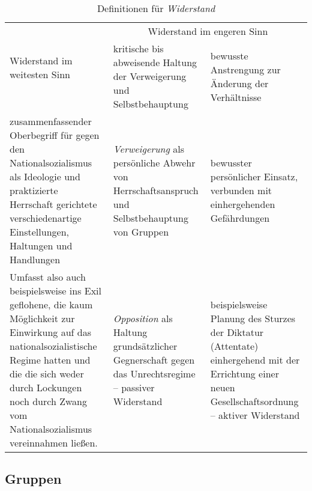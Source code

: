 \begin{table}
\caption{Definitionen für \emph{Widerstand}}
\label{tab:widerst-def}

\newlength{\colwidth}
\setlength{\colwidth}{0.33\textwidth}
\addtolength{\colwidth}{-2\tabcolsep}

\renewcommand*{\arraystretch}{1.5}

\begin{tabular*}{\textwidth}{*{3}{p{\colwidth}}}
\toprule

\multirow{2}{\colwidth}{\centering Widerstand im weitesten Sinn} &
\multicolumn{2}{c}{Widerstand im engeren Sinn} \\

\cmidrule{2-3}

&
kritische bis abweisende Haltung der Verweigerung und Selbstbehauptung
&
bewusste Anstrengung zur Änderung der Verhältnisse \\

\midrule

zusammenfassender Oberbegriff für gegen den Nationalsozialismus als
Ideologie und praktizierte Herrschaft gerichtete verschiedenartige
Einstellungen, Haltungen und Handlungen &
\emph{Verweigerung} als persönliche Abwehr von Herrschaftsanspruch und
Selbstbehauptung von Gruppen &
bewusster persönlicher Einsatz, verbunden mit einhergehenden
Gefährdungen \\

Umfasst also auch beispielsweise ins Exil geflohene, die kaum
Möglichkeit zur Einwirkung auf das nationalsozialistische Regime
hatten und die die sich weder durch Lockungen noch durch Zwang vom
Nationalsozialismus vereinnahmen ließen. &
\emph{Opposition} als Haltung grundsätzlicher Gegnerschaft gegen das
Unrechtsregime -- passiver Widerstand &
beispielsweise Planung des Sturzes der Diktatur (Attentate)
einhergehend mit der Errichtung einer neuen Gesellschaftsordnung --
aktiver Widerstand \\

\bottomrule 
\end{tabular*}
\end{table}


\subsection{Gruppen}

